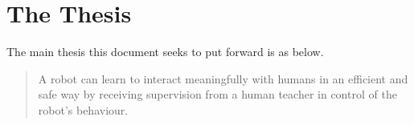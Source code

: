 


\section{The Thesis}\label{sec:intro-thesis}
The main thesis this document seeks to put forward is as below.
\begin{quote}
	A robot can learn to interact meaningfully with humans in an efficient and safe way by receiving supervision from a human teacher in control of the robot's behaviour. 
\end{quote}

